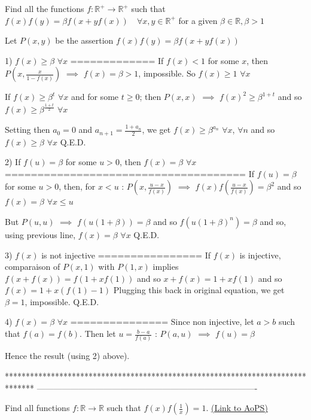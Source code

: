 \begin{solution}
	\begin{tcolorbox}Find all the functions $f:\mathbb{R}^+\to\mathbb{R}^+$ such that $f(x)f(y)=\beta f(x+yf(x)) \quad \forall x,y\in\mathbb{R}^+$ for a given $\beta \in\mathbb R ,\beta>1$\end{tcolorbox}
Let $P(x,y)$ be the assertion $f(x)f(y)=\beta f(x+yf(x))$

1) $f(x)\ge \beta$ $\forall x$
=============
If $f(x)<1$ for some $x$, then $P(x,\frac x{1-f(x)})$ $\implies$ $f(x)=\beta>1$, impossible. So $f(x)\ge 1$ $\forall x$

If $f(x)\ge \beta^t$ $\forall x$ and for some $t\ge 0$; then $P(x,x)$ $\implies$ $f(x)^2\ge \beta^{1+t}$ and so $f(x)\ge \beta^{\frac{1+t}2}$ $\forall x$

Setting then $a_0=0$ and $a_{n+1}=\frac{1+a_n}2$, we get $f(x)\ge \beta^{a_n}$ $\forall x$, $\forall n$ and so $f(x)\ge \beta$ $\forall x$
Q.E.D.

2) If $f(u)=\beta$ for some $u>0$, then $f(x)=\beta$ $\forall x$
=====================================
If $f(u)=\beta$ for some $u>0$, then, for $x<u$ : $P(x,\frac{u-x}{f(x)})$ $\implies$ $f(x)f(\frac{u-x}{f(x)})=\beta^2$ and so $f(x)=\beta$ $\forall x\le u$

But $P(u,u)$ $\implies$ $f(u(1+\beta))=\beta$ and so $f(u(1+\beta)^n)=\beta$ and so, using previous line, $f(x)=\beta$ $\forall x$
Q.E.D.

3) $f(x)$ is not injective
================
If $f(x)$ is injective, comparaison of $P(x,1)$ with $P(1,x)$ implies $f(x+f(x))=f(1+xf(1))$ and so $x+f(x)=1+xf(1)$ and so $f(x)=1+x(f(1)-1)$
Plugging this back in original equation, we get $\beta=1$, impossible.
Q.E.D.

4) $f(x)=\beta$ $\forall x$
===============
Since non injective, let $a>b$ such that $f(a)=f(b)$. Then let $u=\frac{b-a}{f(a)}$ : $P(a,u)$ $\implies$ $f(u)=\beta$ 

Hence the result (using 2) above).
\end{solution}
*******************************************************************************
-------------------------------------------------------------------------------

\begin{problem}
	Find all functions $f: \mathbb{R} \rightarrow \mathbb{R}$ such that $f(x)f \left( \frac{1}x \right) = 1$.
	\flushright \href{https://artofproblemsolving.com/community/c6h589432}{(Link to AoPS)}
\end{problem}



